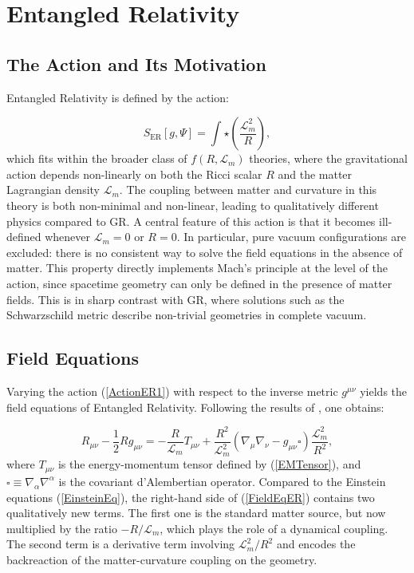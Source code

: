 \documentclass[floats,floatfix,aps, preprintnumbers,nofootinbib]{revtex4-2}
\newcommand{\paren}[1]{\left( #1 \right)}
\newcommand{\mrm}{\mathrm}
\newcommand{\mcal}{\mathcal}
\begin{document}


\section{Entangled Relativity}
\label{sec:ER}

\subsection{The Action and Its Motivation}

Entangled Relativity is defined by the action:

\begin{equation}\label{ActionER1}
    S_{\mrm{ER}}[g, \Psi] = \int \star\paren{\frac{\mcal L_m^2}{R}},
\end{equation}
which fits within the broader class of $f(R, \mcal L_m)$ theories, where the gravitational action depends non-linearly on both the Ricci scalar $R$ and the matter Lagrangian density $\mcal L_m$. The coupling between matter and curvature in this theory is both non-minimal and non-linear, leading to qualitatively different physics compared to GR. A central feature of this action is that it becomes ill-defined whenever $\mcal L_m = 0$ or $R = 0$. In particular, pure vacuum configurations are excluded: there is no consistent way to solve the field equations in the absence of matter. This property directly implements Mach's principle at the level of the action, since spacetime geometry can only be defined in the presence of matter fields. This is in sharp contrast with GR, where solutions such as the Schwarzschild metric describe non-trivial geometries in complete vacuum.

\subsection{Field Equations}

Varying the action (\ref{ActionER1}) with respect to the inverse metric $g^{\mu\nu}$ yields the field equations of Entangled Relativity. Following the results of \cite{Fujii2003ScalarTensor}, one obtains:

\begin{equation}\label{FieldEqER}
    R_{\mu\nu} - \frac{1}{2}Rg_{\mu\nu} = -\frac{R}{\mcal L_m}T_{\mu\nu} + \frac{R^2}{\mcal L_m^2}(\nabla_\mu\nabla_\nu - g_{\mu\nu}\square)\frac{\mcal L_m^2}{R^2},
\end{equation}
where $T_{\mu\nu}$ is the energy-momentum tensor defined by (\ref{EMTensor}), and $\square \equiv \nabla_\alpha\nabla^\alpha$ is the covariant d'Alembertian operator. Compared to the Einstein equations (\ref{EinsteinEq}), the right-hand side of (\ref{FieldEqER}) contains two qualitatively new terms. The first one is the standard matter source, but now multiplied by the ratio $-R/\mcal L_m$, which plays the role of a dynamical coupling. The second term is a derivative term involving $\mcal L_m^2/R^2$ and encodes the backreaction of the matter-curvature coupling on the geometry.
\end{document}
